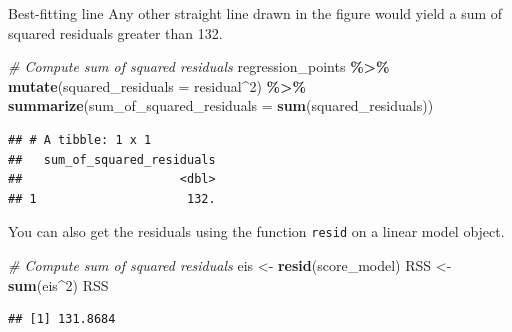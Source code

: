 \documentclass[
  ignorenonframetext,
]{beamer}
\newenvironment{Shaded}{\begin{snugshade}}{\end{snugshade}}
\newcommand{\AttributeTok}[1]{\textcolor[rgb]{0.13,0.29,0.53}{#1}}
\newcommand{\CommentTok}[1]{\textcolor[rgb]{0.56,0.35,0.01}{\textit{#1}}}
\newcommand{\DecValTok}[1]{\textcolor[rgb]{0.00,0.00,0.81}{#1}}
\newcommand{\FunctionTok}[1]{\textcolor[rgb]{0.13,0.29,0.53}{\textbf{#1}}}
\newcommand{\NormalTok}[1]{#1}
\newcommand{\OtherTok}[1]{\textcolor[rgb]{0.56,0.35,0.01}{#1}}
\newcommand{\SpecialCharTok}[1]{\textcolor[rgb]{0.81,0.36,0.00}{\textbf{#1}}}
\begin{document}
\begin{frame}[fragile]{Best-fitting line}
\protect\hypertarget{best-fitting-line-3}{}
Any other straight line drawn in the figure would yield a sum of squared
residuals greater than 132.

\tiny

\begin{Shaded}
\begin{Highlighting}[]
\CommentTok{\# Compute sum of squared residuals}
\NormalTok{regression\_points }\SpecialCharTok{\%\textgreater{}\%}
  \FunctionTok{mutate}\NormalTok{(}\AttributeTok{squared\_residuals =}\NormalTok{ residual}\SpecialCharTok{\^{}}\DecValTok{2}\NormalTok{) }\SpecialCharTok{\%\textgreater{}\%}
  \FunctionTok{summarize}\NormalTok{(}\AttributeTok{sum\_of\_squared\_residuals =} \FunctionTok{sum}\NormalTok{(squared\_residuals))}
\end{Highlighting}
\end{Shaded}

\begin{verbatim}
## # A tibble: 1 x 1
##   sum_of_squared_residuals
##                      <dbl>
## 1                     132.
\end{verbatim}

\normalsize

You can also get the residuals using the function \texttt{resid} on a
linear model object.

\tiny

\begin{Shaded}
\begin{Highlighting}[]
\CommentTok{\# Compute sum of squared residuals}
\NormalTok{eis }\OtherTok{\textless{}{-}} \FunctionTok{resid}\NormalTok{(score\_model)}
\NormalTok{RSS }\OtherTok{\textless{}{-}} \FunctionTok{sum}\NormalTok{(eis}\SpecialCharTok{\^{}}\DecValTok{2}\NormalTok{)}
\NormalTok{RSS}
\end{Highlighting}
\end{Shaded}

\begin{verbatim}
## [1] 131.8684
\end{verbatim}

\normalsize
\end{frame}
\end{document}
